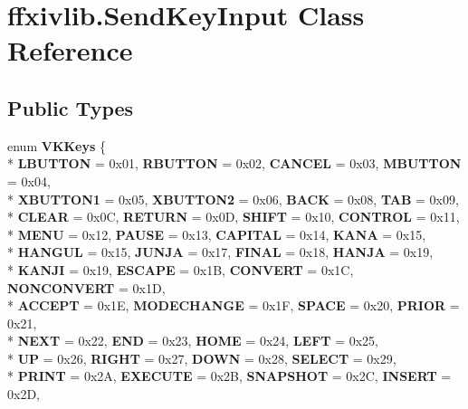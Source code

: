 \hypertarget{classffxivlib_1_1_send_key_input}{\section{ffxivlib.\-Send\-Key\-Input Class Reference}
\label{classffxivlib_1_1_send_key_input}
}
\subsection*{Public Types}
\begin{DoxyCompactItemize}
\item 
enum {\bfseries V\-K\-Keys} \{ \\*
{\bfseries L\-B\-U\-T\-T\-O\-N} = 0x01, 
{\bfseries R\-B\-U\-T\-T\-O\-N} = 0x02, 
{\bfseries C\-A\-N\-C\-E\-L} = 0x03, 
{\bfseries M\-B\-U\-T\-T\-O\-N} = 0x04, 
\\*
{\bfseries X\-B\-U\-T\-T\-O\-N1} = 0x05, 
{\bfseries X\-B\-U\-T\-T\-O\-N2} = 0x06, 
{\bfseries B\-A\-C\-K} = 0x08, 
{\bfseries T\-A\-B} = 0x09, 
\\*
{\bfseries C\-L\-E\-A\-R} = 0x0\-C, 
{\bfseries R\-E\-T\-U\-R\-N} = 0x0\-D, 
{\bfseries S\-H\-I\-F\-T} = 0x10, 
{\bfseries C\-O\-N\-T\-R\-O\-L} = 0x11, 
\\*
{\bfseries M\-E\-N\-U} = 0x12, 
{\bfseries P\-A\-U\-S\-E} = 0x13, 
{\bfseries C\-A\-P\-I\-T\-A\-L} = 0x14, 
{\bfseries K\-A\-N\-A} = 0x15, 
\\*
{\bfseries H\-A\-N\-G\-U\-L} = 0x15, 
{\bfseries J\-U\-N\-J\-A} = 0x17, 
{\bfseries F\-I\-N\-A\-L} = 0x18, 
{\bfseries H\-A\-N\-J\-A} = 0x19, 
\\*
{\bfseries K\-A\-N\-J\-I} = 0x19, 
{\bfseries E\-S\-C\-A\-P\-E} = 0x1\-B, 
{\bfseries C\-O\-N\-V\-E\-R\-T} = 0x1\-C, 
{\bfseries N\-O\-N\-C\-O\-N\-V\-E\-R\-T} = 0x1\-D, 
\\*
{\bfseries A\-C\-C\-E\-P\-T} = 0x1\-E, 
{\bfseries M\-O\-D\-E\-C\-H\-A\-N\-G\-E} = 0x1\-F, 
{\bfseries S\-P\-A\-C\-E} = 0x20, 
{\bfseries P\-R\-I\-O\-R} = 0x21, 
\\*
{\bfseries N\-E\-X\-T} = 0x22, 
{\bfseries E\-N\-D} = 0x23, 
{\bfseries H\-O\-M\-E} = 0x24, 
{\bfseries L\-E\-F\-T} = 0x25, 
\\*
{\bfseries U\-P} = 0x26, 
{\bfseries R\-I\-G\-H\-T} = 0x27, 
{\bfseries D\-O\-W\-N} = 0x28, 
{\bfseries S\-E\-L\-E\-C\-T} = 0x29, 
\\*
{\bfseries P\-R\-I\-N\-T} = 0x2\-A, 
{\bfseries E\-X\-E\-C\-U\-T\-E} = 0x2\-B, 
{\bfseries S\-N\-A\-P\-S\-H\-O\-T} = 0x2\-C, 
{\bfseries I\-N\-S\-E\-R\-T} = 0x2\-D, 

\end{DoxyCompactItemize}
